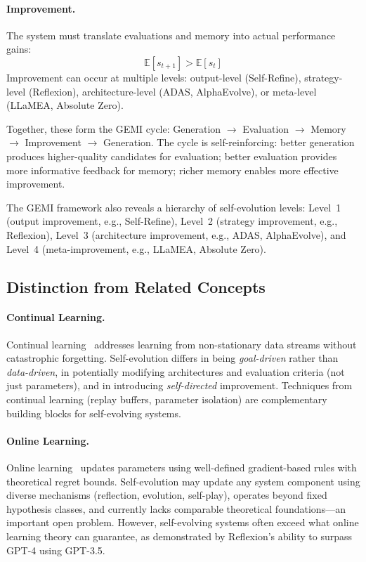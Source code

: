 \paragraph{Improvement.}
The system must translate evaluations and memory into actual performance gains:
\begin{equation}
    \mathbb{E}[s_{t+1}] > \mathbb{E}[s_t]
\end{equation}
Improvement can occur at multiple levels: output-level (Self-Refine), strategy-level (Reflexion), architecture-level (ADAS, AlphaEvolve), or meta-level (LLaMEA, Absolute Zero).

Together, these form the GEMI cycle: Generation $\rightarrow$ Evaluation $\rightarrow$ Memory $\rightarrow$ Improvement $\rightarrow$ Generation. The cycle is self-reinforcing: better generation produces higher-quality candidates for evaluation; better evaluation provides more informative feedback for memory; richer memory enables more effective improvement.

The GEMI framework also reveals a hierarchy of self-evolution levels: Level~1 (output improvement, e.g., Self-Refine), Level~2 (strategy improvement, e.g., Reflexion), Level~3 (architecture improvement, e.g., ADAS, AlphaEvolve), and Level~4 (meta-improvement, e.g., LLaMEA, Absolute Zero).


\subsection{Distinction from Related Concepts}
\label{sec:distinctions}

\paragraph{Continual Learning.}
Continual learning~\citep{parisi2019continual} addresses learning from non-stationary data streams without catastrophic forgetting. Self-evolution differs in being \emph{goal-driven} rather than \emph{data-driven}, in potentially modifying architectures and evaluation criteria (not just parameters), and in introducing \emph{self-directed} improvement. Techniques from continual learning (replay buffers, parameter isolation) are complementary building blocks for self-evolving systems.

\paragraph{Online Learning.}
Online learning~\citep{hazan2016introduction} updates parameters using well-defined gradient-based rules with theoretical regret bounds. Self-evolution may update any system component using diverse mechanisms (reflection, evolution, self-play), operates beyond fixed hypothesis classes, and currently lacks comparable theoretical foundations---an important open problem. However, self-evolving systems often exceed what online learning theory can guarantee, as demonstrated by Reflexion's ability to surpass GPT-4 using GPT-3.5.

